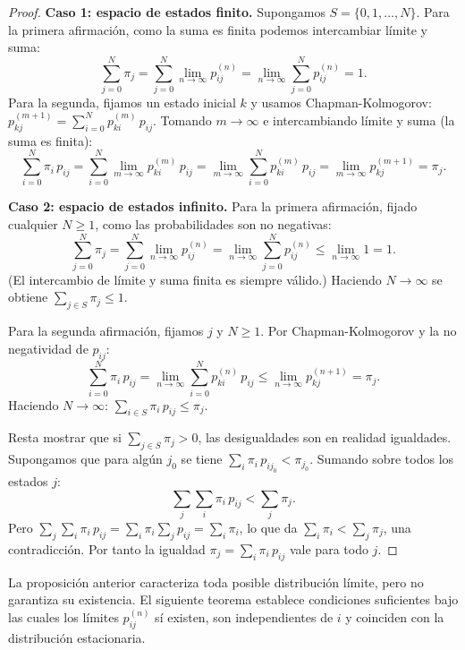 \documentclass[12pt]{book}
\begin{document}
\begin{proof}
    \textbf{Caso 1: espacio de estados finito.}
    Supongamos $S = \{0, 1, \dots, N\}$. Para la primera afirmación, como la suma es finita podemos intercambiar límite y suma:
    \[
        \sum_{j=0}^{N} \pi_j = \sum_{j=0}^{N} \lim_{n\to\infty} p_{ij}^{(n)} = \lim_{n\to\infty} \sum_{j=0}^{N} p_{ij}^{(n)} = 1.
    \]
    Para la segunda, fijamos un estado inicial $k$ y usamos Chapman-Kolmogorov: $p_{kj}^{(m+1)} = \sum_{i=0}^N p_{ki}^{(m)}\,p_{ij}$. Tomando $m\to\infty$ e intercambiando límite y suma (la suma es finita):
    \[
        \sum_{i=0}^{N} \pi_i\, p_{ij} = \sum_{i=0}^{N} \lim_{m\to\infty} p_{ki}^{(m)}\, p_{ij} = \lim_{m\to\infty} \sum_{i=0}^{N} p_{ki}^{(m)}\, p_{ij} = \lim_{m\to\infty} p_{kj}^{(m+1)} = \pi_j.
    \]

    \medskip
    \textbf{Caso 2: espacio de estados infinito.}
    Para la primera afirmación, fijado cualquier $N \ge 1$, como las probabilidades son no negativas:
    \[
        \sum_{j=0}^{N} \pi_j = \sum_{j=0}^{N} \lim_{n\to\infty} p_{ij}^{(n)} = \lim_{n\to\infty} \sum_{j=0}^{N} p_{ij}^{(n)} \le \lim_{n\to\infty} 1 = 1.
    \]
    (El intercambio de límite y suma finita es siempre válido.) Haciendo $N \to \infty$ se obtiene $\sum_{j \in S} \pi_j \le 1$.

    Para la segunda afirmación, fijamos $j$ y $N \ge 1$. Por Chapman-Kolmogorov y la no negatividad de $p_{ij}$:
    \[
        \sum_{i=0}^{N} \pi_i\, p_{ij} = \lim_{n\to\infty} \sum_{i=0}^{N} p_{ki}^{(n)}\, p_{ij} \le \lim_{n\to\infty} p_{kj}^{(n+1)} = \pi_j.
    \]
    Haciendo $N \to \infty$: $\sum_{i \in S} \pi_i\, p_{ij} \le \pi_j$.

    \smallskip
    Resta mostrar que si $\sum_{j \in S}\pi_j > 0$, las desigualdades son en realidad igualdades. Supongamos que para algún $j_0$ se tiene $\sum_{i} \pi_i\, p_{ij_0} < \pi_{j_0}$. Sumando sobre todos los estados $j$:
    \[
        \sum_j \sum_i \pi_i\, p_{ij} < \sum_j \pi_j.
    \]
    Pero $\sum_j \sum_i \pi_i\, p_{ij} = \sum_i \pi_i \sum_j p_{ij} = \sum_i \pi_i$, lo que da $\sum_i \pi_i < \sum_j \pi_j$, una contradicción. Por tanto la igualdad $\pi_j = \sum_i \pi_i\, p_{ij}$ vale para todo $j$.
\end{proof}

La proposición anterior caracteriza toda posible distribución límite, pero no garantiza su existencia. El siguiente teorema establece condiciones suficientes bajo las cuales los límites $p_{ij}^{(n)}$ sí existen, son independientes de $i$ y coinciden con la distribución estacionaria.
\end{document}
